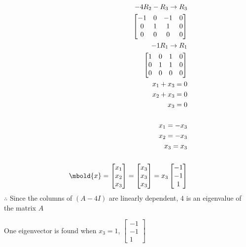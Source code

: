 \documentclass[12pt letter]{report}
\begin{document}
{\begin{align*}
    -4R_2 - R_3  \rightarrow R_3                                                                                        \\
    \begin{bmatrix}
      -1 & 0 & -1 & 0 \\
      0  & 1 & 1  & 0 \\
      0  & 0 & 0  & 0 \\
    \end{bmatrix}
    \\
    -1R_1 \to R_1                                                                                                       \\
    \begin{bmatrix}
      1 & 0 & 1 & 0 \\
      0 & 1 & 1 & 0 \\
      0 & 0 & 0 & 0 \\
    \end{bmatrix}
    \\
    x_1 + x_3 = 0                                                                                                       \\
    x_2 + x_3 = 0                                                                                                       \\
    x_3 = 0                                                                                                             \\
    \\
    x_1 = -x_3                                                                                                          \\
    x_2 = -x_3                                                                                                          \\
    x_3 = x_3                                                                                                           \\
    \\
    \mbold{x} = \begin{bmatrix} x_1 \\ x_2 \\ x_3 \end{bmatrix}  = \begin{bmatrix} x_3 \\ x_3 \\ x_3 \end{bmatrix} = x_3
    \begin{bmatrix} -1 \\ -1 \\ 1 \end{bmatrix}
  \end{align*}
  $\therefore$ Since the columns of $ \left( A - 4I \right) $ are linearly dependent, 4 is an eigenvalue of the matrix $A$

  \noindent One eigenvector is found when $x_3=1$, $\begin{bmatrix} -1 \\ -1 \\ 1 \end{bmatrix} $
}
\end{document}
